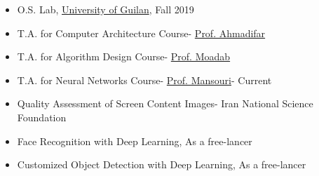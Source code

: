 \documentclass[10pt,a4paper]{altacv}
\begin{document}
	\begin{itemize}
		\item O.S. Lab, \href{https://guilan.ac.ir/en/home}{University of Guilan}, Fall 2019

		\item T.A. for Computer Architecture Course- \href{https://scholar.google.com/citations?user=WT1Jve8AAAAJ&hl=en}{Prof. Ahmadifar}

		\item T.A. for Algorithm Design Course- \href{https://www.linkedin.com/in/shahram-moadab-94b79253/?originalSubdomain=ir}{Prof. Moadab}

		\item T.A. for Neural Networks Course- \href{https://scholar.google.com/citations?user=eK03yPgAAAAJ}{Prof. Mansouri}- Current
	\end{itemize}
	\begin{itemize}
		\item Quality Assessment of Screen Content Images- Iran National Science Foundation

		\item Face Recognition with Deep Learning, As a free-lancer

		\item Customized Object Detection with Deep Learning, As a free-lancer
	\end{itemize}
 
\end{document}

